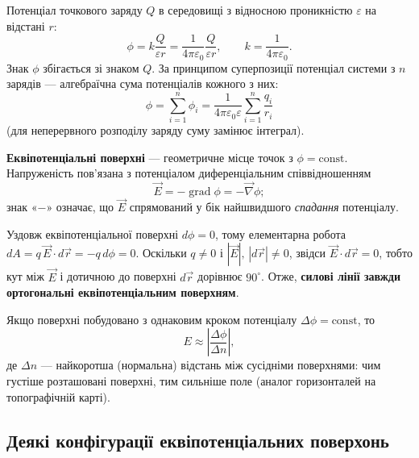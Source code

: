 Потенціал точкового заряду $Q$ в середовищі з відносною проникністю $\varepsilon$ на відстані $r$:
\begin{equation}
\phi = k\frac{Q}{\varepsilon r} = \frac{1}{4\pi\varepsilon_0}\frac{Q}{\varepsilon r}, \qquad k=\frac{1}{4\pi\varepsilon_0}.
\end{equation}
Знак $\phi$ збігається зі знаком $Q$. За принципом суперпозиції потенціал системи з $n$ зарядів — алгебраїчна сума потенціалів кожного з них:
\begin{equation}
\phi = \sum_{i=1}^{n}\phi_i = \frac{1}{4\pi\varepsilon_0\varepsilon}\sum_{i=1}^n\frac{q_i}{r_i}
\end{equation}
(для неперервного розподілу заряду суму замінює інтеграл).

\textbf{Еквіпотенціальні поверхні} — геометричне місце точок з $\phi=\text{const}$. Напруженість пов'язана з потенціалом диференціальним співвідношенням
\begin{equation}
\vec{E} = -\operatorname{grad}\phi = -\vec{\nabla}\phi;
\end{equation}
знак «$-$» означає, що $\vec E$ спрямований у бік найшвидшого \emph{спадання} потенціалу.

Уздовж еквіпотенціальної поверхні $d\phi=0$, тому елементарна робота $dA = q\,\vec E\cdot d\vec r = -q\,d\phi=0$. Оскільки $q\neq0$ і $|\vec E|,\,|d\vec r|\neq0$, звідси $\vec E\cdot d\vec r=0$, тобто кут між $\vec E$ і дотичною до поверхні $d\vec r$ дорівнює $90^\circ$. Отже, \textbf{силові лінії завжди ортогональні еквіпотенціальним поверхням}.

Якщо поверхні побудовано з однаковим кроком потенціалу $\Delta\phi=\text{const}$, то
\begin{equation}
E \approx \left| \frac{\Delta\phi}{\Delta n} \right|,
\end{equation}
де $\Delta n$ — найкоротша (нормальна) відстань між сусідніми поверхнями: чим густіше розташовані поверхні, тим сильніше поле (аналог горизонталей на топографічній карті).

\begin{figure}[h!]
\centering

  \caption{}\label{tikz:eq_surf}
\end{figure}

\subsection{Деякі конфігурації еквіпотенціальних поверхонь}

